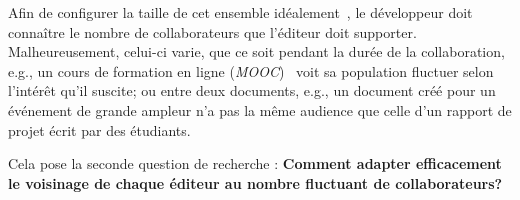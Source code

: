 Afin de configurer la taille de cet ensemble idéalement~\cite{erdos1959random},
le développeur doit connaître le nombre de collaborateurs que l'éditeur doit
supporter. Malheureusement, celui-ci varie, que ce soit pendant la durée de la
collaboration, e.g., un cours de formation en ligne
(\emph{MOOC})~\cite{breslow2013studying} voit sa population fluctuer selon
l'intérêt qu'il suscite; ou entre deux documents, e.g., un document créé pour un
événement de grande ampleur n'a pas la même audience que celle d'un rapport de
projet écrit par des étudiants.

Cela pose la seconde question de recherche : \textbf{Comment adapter
  efficacement le voisinage de chaque éditeur au nombre fluctuant de
  collaborateurs?}




